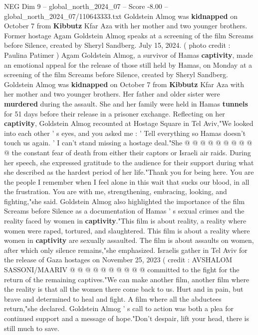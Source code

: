 \begin{textsample}{NEG Dim 9 – global\_north\_2024\_07 – Score -8.00 – global\_north\_2024\_07/110643333.txt}  \label{ex:f9_neg_153}
Goldstein Almog was \textbf{kidnapped} on October 7 from \textbf{Kibbutz} Kfar Aza with her mother and two younger brothers.
Former hostage Agam Goldstein Almog speaks at a screening of the film Screams before Silence, created by Sheryl Sandberg.
July 15, 2024. ( photo credit : Paulina Patimer ) Agam Goldstein Almog, a survivor of Hamas \textbf{captivity}, made an emotional appeal for the release of those still held by Hamas, on Monday at a screening of the film Screams before Silence, created by Sheryl Sandberg.
Goldstein Almog was \textbf{kidnapped} on October 7 from \textbf{Kibbutz} Kfar Aza with her mother and two younger brothers.
Her father and older sister were \textbf{murdered} during the assault.
She and her family were held in Hamas \textbf{tunnels} for 51 days before their release in a prisoner exchange.
Reflecting on her \textbf{captivity}, Goldstein Almog recounted at Hostage Square in Tel Aviv,"We looked into each other ' s eyes, and you asked me : ' Tell everything so Hamas doesn't touch us again. ' I can't stand missing a hostage deal."She @ @ @ @ @ @ @ @ @ @ the constant fear of death from either their captors or Israeli air raids.
During her speech, she expressed gratitude to the audience for their support during what she described as the hardest period of her life."Thank you for being here.
You are the people I remember when I feel alone in this wait that sucks our blood, in all the frustration.
You are with me, strengthening, embracing, looking, and fighting,"she said.
Goldstein Almog also highlighted the importance of the film Screams before Silence as a documentation of Hamas ' s sexual crimes and the reality faced by women in \textbf{captivity}."This film is about reality, a reality where women were raped, tortured, and slaughtered.
This film is about a reality where women in \textbf{captivity} are sexually assaulted.
The film is about assaults on women, after which only silence remains,"she emphasized.
Israelis gather in Tel Aviv for the release of Gaza hostages on November 25, 2023 ( credit : AVSHALOM SASSONI/MAARIV @ @ @ @ @ @ @ @ @ @ committed to the fight for the return of the remaining captives."We can make another film, another film where the reality is that all the women there come back to us.
Hurt and in pain, but brave and determined to heal and fight.
A film where all the abductees return,"she declared.
Goldstein Almog ' s call to action was both a plea for continued support and a message of hope."Don't despair, lift your head, there is still much to save.

\end{textsample}
